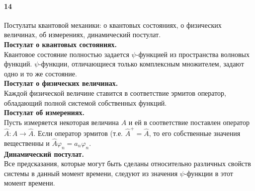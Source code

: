 


\paragraph{14}
Постулаты квантовой механики: о квантовых состояниях, о физических величинах, об измерениях, динамический постулат.\\

\textbf{Постулат о квантовых состояниях.}\\
Квантовое состояние полностью задается $\psi$-функцией из пространства волновых функций. $\psi$-функции, отличающиеся только комплексным множителем, задают одно и то же состояние.\\

\textbf{Постулат о физических величинах.}\\
Каждой физической величине ставится в соответствие эрмитов оператор, обладающий полной системой собственных функций.\\

\textbf{Постулат об измерениях.}\\
Пусть измеряется некоторая величина $A$ и ей в соответствие поставлен оператор $\hat{A}: A \rightarrow \hat{A}$. Если оператор эрмитов (т.е. $\hat{A}^{+}=\hat{A}$, то его собственные значения вещественны и $\hat{A}\varphi_n=a_n\varphi_n$.\\

\textbf{Динамический постулат.}\\
Все предсказания, которые могут быть сделаны относительно различных свойств системы в данный момент времени, следуют из значения $\psi$-функции в этот момент времени.\\
